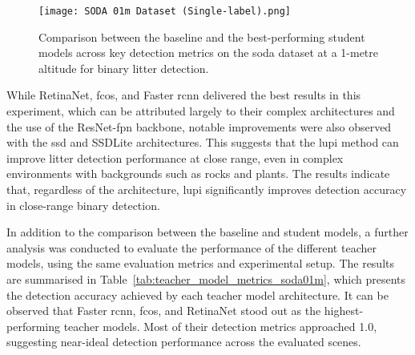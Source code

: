 \begin{figure}[!ht]
    \centering
    \texttt{[image: SODA 01m Dataset (Single-label).png]}
    \caption{Comparison between the baseline and the best-performing student models across key detection metrics on the \gls{soda} dataset at a 1-metre altitude for binary litter detection.}
    \label{fig:soda01m_bar}
\end{figure}

While RetinaNet, \gls{fcos}, and Faster \gls{rcnn} delivered the best results in this experiment, which can be attributed largely to their complex architectures and the use of the ResNet-\gls{fpn} backbone, notable improvements were also observed with the \gls{ssd} and SSDLite architectures. This suggests that the \gls{lupi} method can improve litter detection performance at close range, even in complex environments with backgrounds such as rocks and plants. The results indicate that, regardless of the architecture, \gls{lupi} significantly improves detection accuracy in close-range binary detection.

In addition to the comparison between the baseline and student models, a further analysis was conducted to evaluate the performance of the different teacher models, using the same evaluation metrics and experimental setup. The results are summarised in Table~\ref{tab:teacher_model_metrics_soda01m}, which presents the detection accuracy achieved by each teacher model architecture. It can be observed that Faster \gls{rcnn}, \gls{fcos}, and RetinaNet stood out as the highest-performing teacher models. Most of their detection metrics approached 1.0, suggesting near-ideal detection performance across the evaluated scenes. 

